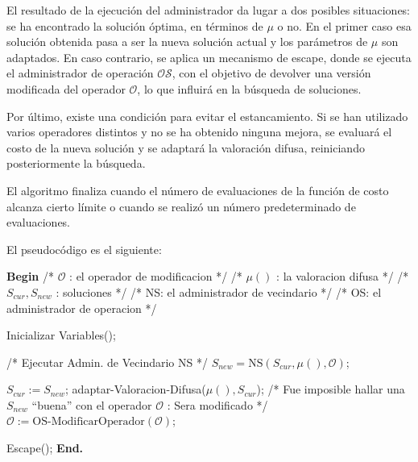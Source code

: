 \documentclass{article}
\begin{document}
El resultado de la ejecución del administrador da lugar a dos posibles situaciones: se ha encontrado la solución óptima, en términos de $\mu$ o no.
En el primer caso esa solución obtenida pasa a ser la nueva solución actual y los parámetros de $\mu$ son adaptados.
En caso contrario, se aplica un mecanismo de escape, donde se ejecuta el administrador de operación $\mathcal{OS}$, con el objetivo de devolver una versión modificada del operador $\mathcal{O}$, lo que influirá en la búsqueda de soluciones.

Por último, existe una condición para evitar el estancamiento. Si se han utilizado varios operadores distintos y no se ha obtenido ninguna mejora, se evaluará el costo de la nueva solución y se adaptará la valoración difusa, reiniciando posteriormente la búsqueda.

El algoritmo finaliza cuando el número de
evaluaciones de la función de costo alcanza
cierto límite o cuando se realizó un número
predeterminado de evaluaciones.

El pseudocódigo es el siguiente:

\begin{algorithm}
\caption{Procedimiento FANS}
\begin{algorithmic}[0] %

\State \textbf{Begin}
    \State \quad /* $\mathcal{O}$ : el operador de modificacion */
    \State \quad /* $\mu()$ : la valoracion difusa */
    \State \quad /* $S_{cur}, S_{new}$ : soluciones */
    \State \quad /* NS: el administrador de vecindario */
    \State \quad /* OS: el administrador de operacion */
    
    \State Inicializar Variables();
    
        \State /* Ejecutar Admin. de Vecindario NS */
        \State $S_{new} = \text{NS}(S_{cur}, \mu(), \mathcal{O})$;
        
            \State $S_{cur} := S_{new}$;
            \State adaptar-Valoracion-Difusa($\mu(), S_{cur}$);
        \Else
            \State /* Fue imposible hallar una $S_{new}$ ``buena'' 
            \State \quad con el operador $\mathcal{O}$ : Sera modificado */
            \State $\mathcal{O} := \text{OS-ModificarOperador}(\mathcal{O})$;
        \EndIf
        
            \State Escape();
        \EndIf
    \EndWhile
\State \textbf{End.}

\end{algorithmic}
\end{algorithm}
\end{document}
